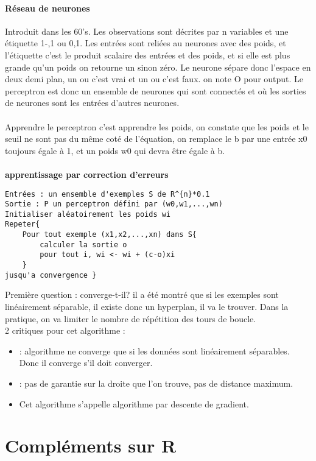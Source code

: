 \documentclass{article}
\begin{document}
\paragraph{Réseau de neurones} Introduit dans les 60's. Les observations sont décrites par n variables et une étiquette 1-,1 ou 0,1. Les entrées sont reliées au neurones avec des poids, et l'étiquette c'est le produit scalaire des entrées et des poids, et si elle est plus grande qu'un poids on retourne un sinon zéro. Le neurone sépare donc l'espace en deux demi plan, un ou c'est vrai et un ou c'est faux. on note O pour output. Le perceptron est donc un ensemble de neurones qui sont connectés et où les sorties de neurones sont les entrées d'autres neurones.\\\\Apprendre le perceptron c'est apprendre les poids, on constate que les poids et le seuil ne sont pas du même coté de l'équation, on remplace le b par une entrée x0 toujours égale à 1, et un poids w0 qui devra être égale à b.\\\\\textbf{apprentissage par correction d'erreurs} \begin{verbatim}
Entrées : un ensemble d'exemples S de R^{n}*0.1
Sortie : P un perceptron défini par (w0,w1,...,wn)
Initialiser aléatoirement les poids wi
Repeter{
	Pour tout exemple (x1,x2,...,xn) dans S{
		calculer la sortie o
		pour tout i, wi <- wi + (c-o)xi
	}
jusqu'a convergence }
\end{verbatim}
Première question : converge-t-il? il a été montré que si les exemples sont linéairement séparable, il existe donc un hyperplan, il va le trouver. Dans la pratique, on va limiter le nombre de répétition des tours de boucle.\\ 2 critiques pour cet algorithme : \begin{itemize}
\item : algorithme ne converge que si les données sont linéairement séparables. Donc il converge s'il doit converger.
\item : pas de garantie sur la droite que l'on trouve, pas de distance maximum.
\item Cet algorithme s'appelle algorithme par descente de gradient. 
\end{itemize}

\section{Compléments sur R}
\end{document}
